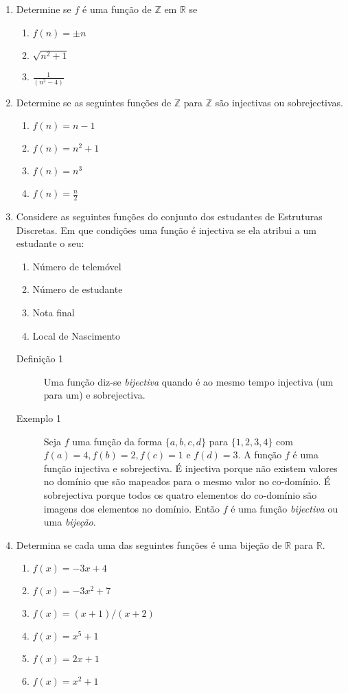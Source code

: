 \begin{enumerate}
	\item Determine se $f$ é uma função de $\mathbb{Z}$ em $\mathbb{R}$ se
	\begin{enumerate}
		\item $f(n) = \pm n$ \item $\sqrt{n^2 + 1}$ \item $\frac{1}{(n^2 - 4)}$  
	\end{enumerate}
	
	\item Determine se as seguintes funções de $\mathbb{Z}$ para $\mathbb{Z}$ são injectivas ou sobrejectivas.
	\begin{enumerate}
	  	\item $f(n) = n - 1$ \item $f(n) = n^2 + 1$ \item $f(n) = n^3$ \item $f(n) = \frac{n}{2}$
	\end{enumerate}
	
	\item Considere as seguintes funções do conjunto dos estudantes de Estruturas Discretas. Em que condições uma função é injectiva
	se ela atribui a um estudante o seu:
	\begin{enumerate}
	  	\item Número de telemóvel
	   	\item Número de estudante
	   	\item Nota final
	   	\item Local de Nascimento
	\end{enumerate}

	\begin{description}
		\item[Definição 1] Uma função diz-se \emph{bijectiva} quando é ao mesmo tempo injectiva (um para um) e sobrejectiva.
		\item[Exemplo 1] Seja $f$ uma função da forma $\{a,b,c,d\}$ para $\{1,2,3,4\}$ com $f(a) = 4, f(b) = 2, f(c) = 1$ e $f(d) = 3$.
		A função $f$ é uma função injectiva e sobrejectiva. É injectiva porque não existem valores no domínio que são mapeados
		para o mesmo valor no co-domínio. É sobrejectiva porque todos os quatro elementos do co-domínio são imagens dos elementos
		no domínio. Então $f$ é uma função \emph{bijectiva} ou uma \emph{bijeção}.	
	\end{description}
	
	\item Determina se cada uma das seguintes funções é uma bijeção de $\mathbb{R}$ para $\mathbb{R}$.
	\begin{enumerate}
		\item $f(x) = -3x + 4$ \item $f(x) = -3x^2 + 7$ \item $f(x) = (x+1)/(x+2)$ \item $f(x) = x^5 + 1$ \item $f(x) = 2x + 1$
		\item $f(x) = x^2 + 1$
	\end{enumerate}
	

\end{enumerate}
